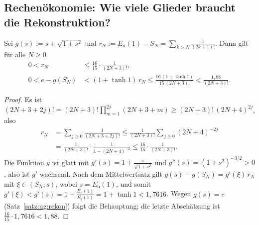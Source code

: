 \subsection{Rechenökonomie: Wie viele Glieder braucht die Rekonstruktion?}
\label{sec:ug:rechnen}

\begin{satz}\label{satz:ug:fehler}
Sei $g(s):=s+\sqrt{1+s^2}$ und $r_N:=E_{\mathrm u}(1)-S_N=\sum_{k>N}\frac1{(2k+1)!}$. Dann gilt für alle $N\ge0$
\begin{align*}
0<r_N&\le\frac{16}{15}\cdot\frac1{(2N+3)!},\\
0<e-g(S_N)&<(1+\tanh 1)\,r_N\le\frac{16\,(1+\tanh1)}{15\,(2N+3)!}<\frac{1{,}88}{(2N+3)!}.
\end{align*}
\end{satz}

\begin{proof}
Es ist $(2N+3+2j)!=(2N+3)!\prod_{m=1}^{2j}(2N+3+m)\ge(2N+3)!\,(2N+4)^{2j}$, also
\begin{align*}
r_N&=\sum_{j\ge0}\frac1{(2N+3+2j)!}\le\frac1{(2N+3)!}\sum_{j\ge0}(2N+4)^{-2j}\\
&=\frac{1}{(2N+3)!}\cdot\frac1{1-(2N+4)^{-2}}\le\frac{16}{15}\cdot\frac1{(2N+3)!}.
\end{align*}
Die Funktion $g$ ist glatt mit $g'(s)=1+\frac s{\sqrt{1+s^2}}$ und $g''(s)=(1+s^2)^{-3/2}>0$, also ist $g'$ wachsend. Nach dem Mittelwertsatz gilt $g(s)-g(S_N)=g'(\xi)\,r_N$ mit $\xi\in(S_N,s)$, wobei $s=E_{\mathrm u}(1)$, und somit $g'(\xi)<g'(s)=1+\frac{E_{\mathrm u}(1)}{E_{\mathrm g}(1)}=1+\tanh1<1{,}7616$. Wegen $g(s)=e$ (Satz~\ref{satz:ug:rekon}) folgt die Behauptung; die letzte Abschätzung ist $\tfrac{16}{15}\cdot1{,}7616<1{,}88$.
\end{proof}


